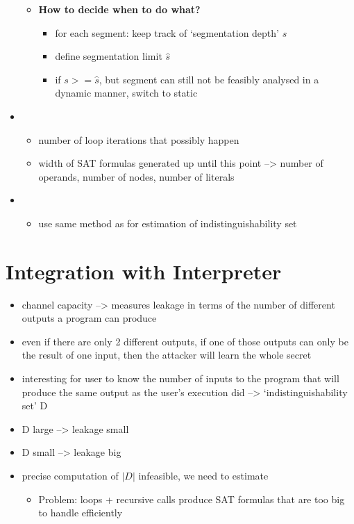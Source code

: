 \begin{itemize}
\begin{itemize}
        \item \textbf{How to decide when to do what?}
        \begin{itemize}
            \item for each segment: keep track of `segmentation depth' $s$
            \item define segmentation limit $\hat{s}$
            \item if $s >= \hat{s}$, but segment can still not be feasibly analysed in a dynamic manner, switch to static 
        \end{itemize}
    \end{itemize}
    
    
    \item {}
    \begin{itemize}
        \item number of loop iterations that possibly happen
        \item width of SAT formulas generated up until this point --> number of operands, number of nodes, number of literals
        
    \end{itemize}
     \item {}
    \begin{itemize}
        \item use same method as for estimation of indistinguishability set
    \end{itemize}
    
\end{itemize}


\section{Integration with Interpreter}
\begin{itemize}
    \item channel capacity --> measures leakage in terms of the number of different outputs a program can produce
    \item even if there are only 2 different outputs, if one of those outputs can only be the result of one input, then the attacker will learn the whole secret
    \item interesting for user to know the number of inputs to the program that will produce the same output as the user's execution did --> `indistinguishability set' D
    \item D large --> leakage small
    \item D small --> leakage big
    \item precise computation of $|D|$ infeasible, we need to estimate
    \begin{itemize}
        \item Problem: loops + recursive calls produce SAT formulas that are too big to handle efficiently
    \end{itemize}
\end{itemize}


